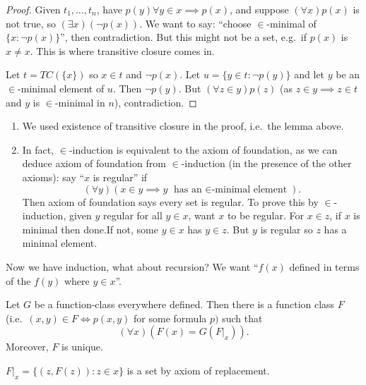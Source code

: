 \documentclass[a4paper]{article}
\begin{document}
\begin{proof}
  Given \(t_1, \dots, t_n\), have \(p(y) \forall y \in x \implies p(x)\), and suppose \((\forall x) p(x)\) is not true, so \((\exists x) (\neg p(x))\). We want to say: ``choose \(\in\)-minimal of \(\{x: \neg p(x)\}\)'', then contradiction. But this might not be a set, e.g.\ if \(p(x)\) is \(x \neq x\). This is where transitive closure comes in.

  Let \(t = TC(\{x\})\) so \(x \in t\) and \(\neg p(x)\). Let \(u = \{y \in t: \neg p(y)\}\) and let \(y\) be an \(\in\)-minimal element of \(u\). Then \(\neg p(y)\). But \((\forall z \in y) p(z)\) (as \(z \in y \implies z \in t\) and \(y\) is \(\in\)-minimal in \(n\)), contradiction.
\end{proof}

\begin{remark}\leavevmode
  \begin{enumerate}
  \item We used existence of transitive closure in the proof, i.e.\ the lemma above.
  \item In fact, \(\in\)-induction is equivalent to the axiom of foundation, as we can deduce axiom of foundation from \(\in\)-induction (in the presence of the other axioms): say ``\(x\) is regular'' if
    \[
      (\forall y) (x \in y \implies y \text{ has an \(\in\)-minimal element}).
    \]
    Then axiom of foundation says every set is regular. To prove this by \(\in\)-induction, given \(y\) regular for all \(y \in x\), want \(x\) to be regular. For \(x \in z\), if \(x\) is minimal then done.If not, some \(y \in x\) has \(y \in z\). But \(y\) is regular so \(z\) has a minimal element.
  \end{enumerate}
\end{remark}

Now we have induction, what about recursion? We want ``\(f(x)\) defined in terms of the \(f(y)\) where \(y \in x\)''.

\begin{theorem}
  Let \(G\) be a function-class everywhere defined. Then there is a function class \(F\) (i.e.\ \((x, y) \in F \iff p(x, y)\) for some formula \(p)\) such that
  \[
    (\forall x) (F(x) = G(F|_x)).
  \]
  Moreover, \(F\) is unique.
\end{theorem}

\begin{note}
  \(F|_x = \{(z, F(z)): z \in x\}\) is a set by axiom of replacement.
\end{note}
\end{document}
